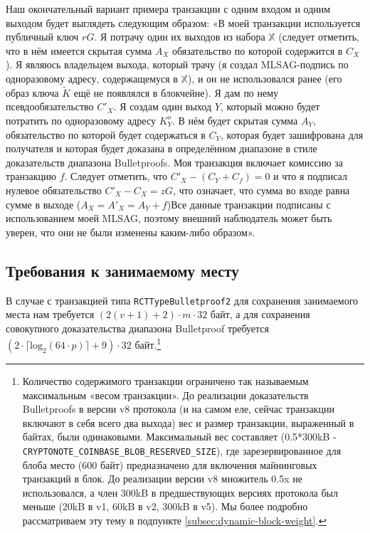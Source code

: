 Наш окончательный вариант примера транзакции с одним входом и одним выходом будет выглядеть следующим образом: «В моей транзакции используется публичный ключ $r G$. Я потрачу один их выходов из набора $\mathbb{X}$ (следует отметить, что в нём имеется скрытая сумма $A_X$ обязательство по которой содержится в $C_X$). Я являюсь владельцем выхода, который трачу (я создал MLSAG-подпись по одноразовому адресу, содержащемуся в $\mathbb{X}$), и он не использовался ранее (его образ  ключа $\tilde{K}$ ещё не появлялся в блокчейне). Я дам по нему псевдообязательство $C'_X$. Я создам один выход $Y$, который можно будет потратить по одноразовому адресу $K^o_Y$. В нём будет скрытая сумма $A_Y$, обязательство по которой будет содержаться в $C_Y$, которая будет зашифрована для получателя и которая будет доказана в определённом диапазоне в стиле доказательств диапазона Bulletproofs. Моя транзакция включает комиссию за транзакцию $f$. Следует отметить, что $C'_X - (C_Y + C_f) = 0$ и что я подписал нулевое обязательство $C'_X - C_X = z G$, что означает, что сумма во входе равна сумме в выходе ($A_X = A'_X = A_Y + f$)Все данные транзакции подписаны с использованием моей MLSAG, поэтому внешний наблюдатель может быть уверен, что они не были изменены каким-либо образом».


\newpage
\subsection{Требования к занимаемому месту}

В случае с транзакцией типа {\tt RCTTypeBulletproof2} для сохранения занимаемого места нам требуется $(2(v+1)+2) \cdot m \cdot 32$ байт, а для сохранения совокупного доказательства диапазона Bulletproof требуется $(2 \cdot \lceil \textrm{log}_2(64 \cdot p) \rceil + 9) \cdot 32$ байт.\footnote{Количество содержимого транзакции ограничено так называемым максимальным «весом транзакции». До реализации доказательств Bulletproofs в версии v8 протокола (и на самом еле, сейчас транзакции включают в себя всего два выхода) вес и размер транзакции, выраженный в байтах, были одинаковыми. Максимальный вес составляет (0.5*300kB - {\tt CRYPTONOTE\_COINBASE\_BLOB\_RESERVED\_SIZE}), где зарезервированное для блоба место (600 байт) предназначено для включения майнинговых транзакций в блок. До реализации версии v8 множитель 0.5x не использовался, а член 300kB в предшествующих версиях протокола был меньше (20kB в v1, 60kB в v2, 300kB в v5). Мы более подробно рассматриваем эту тему в подпункте \ref{subsec:dynamic-block-weight}.}

